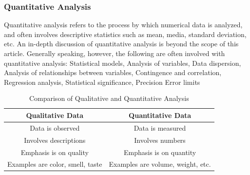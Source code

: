 \documentclass[a4paper,12pt,oneside]{report}
\begin{document}
{{\subsubsection{Quantitative Analysis}
{   Quantitative analysis refers to the process by which numerical data is analyzed, and often involves descriptive statistics such as mean, media, standard deviation, etc. An in-depth discussion of quantitative analysis is beyond the scope of this article. Generally speaking, however, the following are often involved with quantitative analysis:
Statistical models, Analysis of variables, Data dispersion, Analysis of relationships between variables, Contingence and correlation, Regression analysis, Statistical significance, Precision Error limits}
\begin{table}
\begin{center}
\begin{tabular}{|c|c|}
\hline
Qualitative Data & Quantitative Data\\
\hline
Data is observed  & Data is measured \\
\hline
Involves descriptions& Involves numbers \\
\hline
Emphasis is on quality&Emphasis is on quantity\\
\hline
Examples are color, smell, taste&Examples are volume, weight, etc.\\
\hline
\end{tabular}
\end{center}
\caption{Comparison of Qualitative and Quantitative Analysis}
\end{table}
}}
\end{document}
